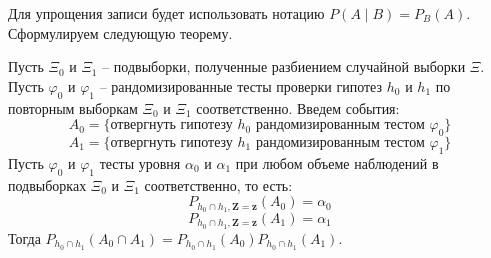 Для упрощения записи будет использовать нотацию 
$P(A \mid B)=P_{B}(A)$. Сформулируем следующую теорему.
\begin{theorem}\label{main_theorem}
    Пусть $\Xi_0$ и $\Xi_1$ -- подвыборки, полученные разбиением случайной выборки $\Xi$.
    Пусть $\varphi_0$ и $\varphi_1$ -- рандомизированные тесты 
    проверки гипотез $h_0$ и $h_1$ по повторным выборкам 
    $\Xi_0$ и $\Xi_1$ соответственно.
    Введем события:
    $$A_0 = \{\text{отвергнуть гипотезу $h_0$ рандомизированным тестом $\varphi_0$}\}$$ 
    $$A_1 = \{\text{отвергнуть гипотезу $h_1$ рандомизированным тестом $\varphi_1$}\}$$
    Пусть $\varphi_0$ и $\varphi_1$ тесты уровня $\alpha_0$ и $\alpha_1$
    при любом объеме наблюдений в подвыборках $\Xi_0$ и $\Xi_1$ соответственно, то есть:
    $$P_{h_0\cap h_1,\mathbf{Z=z}}(A_0)=\alpha_0$$ 
    $$P_{h_0\cap h_1,\mathbf{Z=z}}(A_1)=\alpha_1$$
    Тогда $P_{h_0\cap h_1}(A_0 \cap A_1)= P_{h_0\cap h_1}(A_0) P_{h_0\cap h_1}(A_1)$.
\end{theorem}
